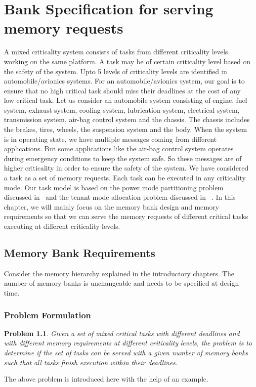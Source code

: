 \chapter{Bank Specification for serving memory requests}\label{ch4}
\noindent
A mixed criticality system consists of tasks from different criticality levels working on the same platform. A task may be 
of certain criticality level based on the safety of the system. Upto 5 levels of criticality levels are identified in 
automobile/avionics systems. For an automobile/avionics system, our goal is to ensure that no high critical task should miss 
their deadlines at the cost of any low critical task.
\newline
\newline
Let us consider an automobile system consisting of engine, fuel system, exhaust system, cooling system, lubrication system,
electrical system, transmission system, air-bag control system and the chassis. The chassis includes the brakes, tires, 
wheels, the suspension system and the body. When the system is in operating state, we have multiple messages coming from 
different applications. But some applications like the air-bag control system operates during emergency conditions to keep 
the system safe. So these messages are of higher criticality in order to ensure the safety of the system. 
\newline
\newline
We have considered a task as a set of memory requests. Each task can be executed in any criticality mode. Our task model is based on the power mode partitioning problem discussed in~\cite{DBLP:conf/vlsid/RayDC07} and the tenant mode allocation problem discussed in ~\cite{DBLP:conf/im/NandiBGB13, DBLP:journals/soca/NandiGBB17}. In this chapter, we will mainly focus on the memory bank design and memory requirements so that we can serve the memory 
requests of different critical tasks executing at different criticality levels.


\section{Memory Bank Requirements}\label{mrr}
Consider the memory hierarchy explained in the introductory chapters. The number of memory banks is unchangeable and needs to 
be specified at design time. 
\subsection{Problem Formulation}\label{pf1a}
\newtheorem{problem}{Problem}[section]
\begin{problem}
    Given a set of mixed critical tasks with different deadlines and with different memory requirements at different 
    criticality levels, the problem is to determine if the set of tasks can be served with a given number of memory banks such that all tasks finish execution within their 
    deadlines. 
\end{problem}
The above problem is introduced here with the help of an example.


